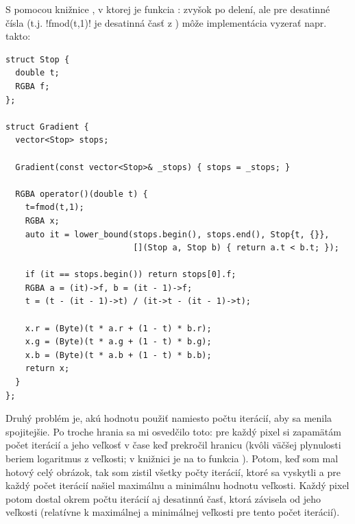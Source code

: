 S pomocou knižnice , v ktorej je funkcia : zvyšok
po delení, ale pre desatinné čísla (t.j. \prg!fmod(t,1)! je desatinná
časť z ) môže implementácia vyzerať napr. takto:


\begin{lstlisting}
struct Stop {
  double t;
  RGBA f;
};

struct Gradient {
  vector<Stop> stops;

  Gradient(const vector<Stop>& _stops) { stops = _stops; }

  RGBA operator()(double t) {
    t=fmod(t,1);
    RGBA x;
    auto it = lower_bound(stops.begin(), stops.end(), Stop{t, {}},
                          [](Stop a, Stop b) { return a.t < b.t; });

    if (it == stops.begin()) return stops[0].f;
    RGBA a = (it)->f, b = (it - 1)->f;
    t = (t - (it - 1)->t) / (it->t - (it - 1)->t);

    x.r = (Byte)(t * a.r + (1 - t) * b.r);
    x.g = (Byte)(t * a.g + (1 - t) * b.g);
    x.b = (Byte)(t * a.b + (1 - t) * b.b);
    return x;
  }
};
\end{lstlisting}


Druhý problém je, akú hodnotu použiť namiesto počtu iterácií, aby sa menila spojitejšie.
Po troche hrania sa mi osvedčilo toto: pre každý pixel si zapamätám počet iterácií a
jeho veľkosť v čase keď prekročil hranicu (kvôli väčšej plynulosti beriem logaritmus
z veľkosti; v knižnici  je na to funkcia ). Potom, keď som mal
hotový celý obrázok, tak som zistil všetky počty iterácií, ktoré sa vyskytli a pre každý počet iterácií našiel maximálnu a minimálnu hodnotu
veľkosti. Každý pixel potom dostal okrem počtu iterácií aj desatinnú časť, ktorá závisela od
jeho veľkosti (relatívne k maximálnej a minimálnej veľkosti pre tento počet iterácií).


